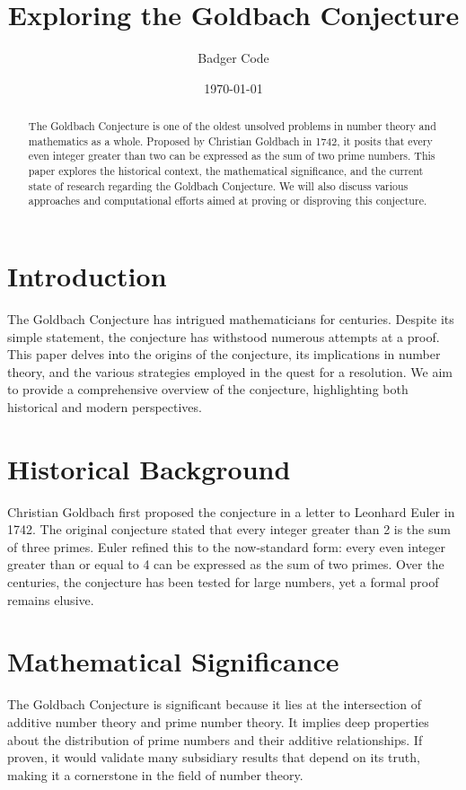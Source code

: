 \documentclass[a4paper, 12pt]{article}
\title{\textbf{\huge Exploring the Goldbach Conjecture}}
\author{Badger Code}
\date{\today}
\begin{document}
\maketitle

\begin{abstract}
The Goldbach Conjecture is one of the oldest unsolved problems in number theory and mathematics as a whole. Proposed by Christian Goldbach in 1742, it posits that every even integer greater than two can be expressed as the sum of two prime numbers. This paper explores the historical context, the mathematical significance, and the current state of research regarding the Goldbach Conjecture. We will also discuss various approaches and computational efforts aimed at proving or disproving this conjecture.
\end{abstract}

\section{Introduction}
The Goldbach Conjecture has intrigued mathematicians for centuries. Despite its simple statement, the conjecture has withstood numerous attempts at a proof. This paper delves into the origins of the conjecture, its implications in number theory, and the various strategies employed in the quest for a resolution. We aim to provide a comprehensive overview of the conjecture, highlighting both historical and modern perspectives.

\section{Historical Background}
Christian Goldbach first proposed the conjecture in a letter to Leonhard Euler in 1742. The original conjecture stated that every integer greater than 2 is the sum of three primes. Euler refined this to the now-standard form: every even integer greater than or equal to 4 can be expressed as the sum of two primes. Over the centuries, the conjecture has been tested for large numbers, yet a formal proof remains elusive.

\section{Mathematical Significance}
The Goldbach Conjecture is significant because it lies at the intersection of additive number theory and prime number theory. It implies deep properties about the distribution of prime numbers and their additive relationships. If proven, it would validate many subsidiary results that depend on its truth, making it a cornerstone in the field of number theory.
\end{document}

